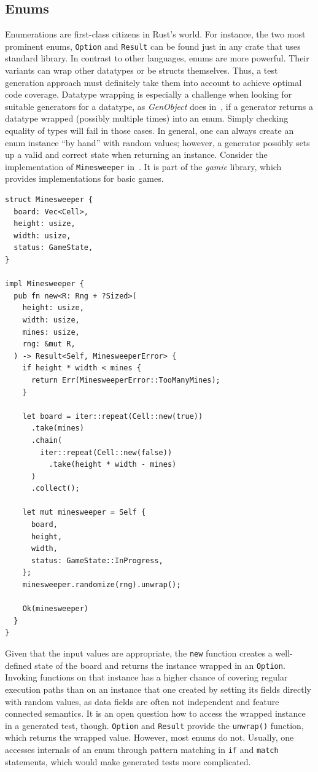 \documentclass[paper=a4,%
  twoside,%
  BCOR4mm,%
  abstract=true,%
  toc=bibliography,%
  chapterprefix=true,%
  toc=bibliographynumbered,%
  open=right,%
  english,%
  pagesize=pdftex]{scrreprt}
\begin{document}
\subsection*{Enums}
Enumerations are first-class citizens in Rust's world. For instance, the two most prominent enums, \texttt{Option} and \texttt{Result} can be found just in any crate that uses standard library. In contrast to other languages, enums are more powerful. Their variants can wrap other datatypes or be structs themselves. Thus, a test generation approach must definitely take them into account to achieve optimal code coverage. Datatype wrapping is especially a challenge when looking for suitable generators for a datatype, as \emph{GenObject} does in~, if a generator returns a datatype wrapped (possibly multiple times) into an enum. Simply checking equality of types will fail in those cases. In general, one can always create an enum instance ``by hand'' with random values; however, a generator possibly sets up a valid and correct state when returning an instance. Consider the implementation of \texttt{Minesweeper} in~. It is part of the \emph{gamie} library, which provides implementations for basic games.

\begin{lstlisting}[style=boxed, caption={A code excerpt from \emph{gamie}}, label=lst:minesweeper, escapechar=§]
struct Minesweeper {
  board: Vec<Cell>,
  height: usize,
  width: usize,
  status: GameState,
}

impl Minesweeper {
  pub fn new<R: Rng + ?Sized>(
    height: usize,
    width: usize,
    mines: usize,
    rng: &mut R,
  ) -> Result<Self, MinesweeperError> {
    if height * width < mines {
      return Err(MinesweeperError::TooManyMines);
    }

    let board = iter::repeat(Cell::new(true))
      .take(mines)
      .chain(
        iter::repeat(Cell::new(false))
          .take(height * width - mines)
      )
      .collect();

    let mut minesweeper = Self {
      board,
      height,
      width,
      status: GameState::InProgress,
    };
    minesweeper.randomize(rng).unwrap();

    Ok(minesweeper)
  }
}
\end{lstlisting}

Given that the input values are appropriate, the \texttt{new} function creates a well-defined state of the board and returns the instance wrapped in an \texttt{Option}. Invoking functions on that instance has a higher chance of covering regular execution paths than on an instance that one created by setting its fields directly with random values, as data fields are often not independent and feature connected semantics. It is an open question how to access the wrapped instance in a generated test, though. \texttt{Option} and \texttt{Result} provide the \texttt{unwrap()} function, which returns the wrapped value. However, most enums do not. Usually, one accesses internals of an enum through pattern matching in \texttt{if} and \texttt{match} statements, which would make generated tests more complicated.
\end{document}
